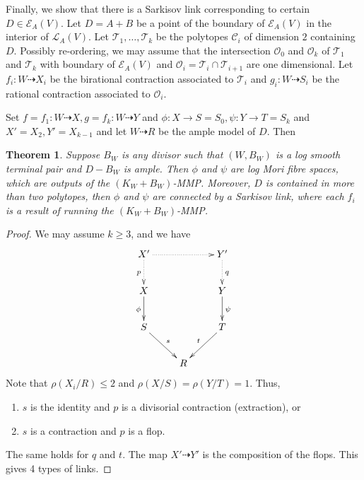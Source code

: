 \documentclass[11pt]{amsart}
\newtheorem{thm}[defn]{Theorem}
\begin{document}
Finally, we show that there is a Sarkisov link corresponding to certain $D \in \mathcal{E}_{A}(V)$. Let $ D=A+B $ be a point of the boundary of $ \mathcal{E}_A(V) $ in the interior of $ \mathcal{L}_A(V) $. Let $ \mathcal{T}_1, \ldots, \mathcal{T}_k $ be the polytopes $ \mathcal{C}_i $ of dimension $ 2 $ containing $ D $. Possibly re-ordering, we may assume that  the intersection  $ \mathcal{O}_0 $ and $ \mathcal{O}_k $ of $ \mathcal{T}_1 $ and $ \mathcal{T}_k $ with boundary of $ \mathcal{E}_A(V) $ and  $ \mathcal{O}_i=\mathcal{T}_i\cap\mathcal{T}_{i+1} $ are one dimensional. Let $ f_i:W\dashrightarrow  X_i $ be the birational contraction associated to $ \mathcal{T}_i $ and $ g_i:W\dashrightarrow  S_i $ be the rational contraction associated to $ \mathcal{O}_i $.
\begin{center}
\end{center}

Set $ f=f_1:W\dashrightarrow X, g=f_k:W\dashrightarrow Y $ and $ \phi:X\to S=S_0,\psi:Y\to T=S_k $ and $ X'=X_2,Y'=X_{k-1} $ and let $ W\dashrightarrow R $ be the ample model of $ D $. Then
\begin{thm}\label{constructlink}
  \cite[Theorem 3.7]{haconSarkisovProgram2012} Suppose $ B_W $ is any divisor such that $ (W,B_W) $ is a log smooth terminal pair and $ D-B_W $ is ample. Then $ \phi $ and $ \psi $ are log Mori fibre spaces, which are outputs of the $ (K_W+B_W) $-MMP. Moreover, $ D $ is contained in more than two polytopes, then $\phi$ and $\psi$ are connected by a Sarkisov link, where each $f_{i}$ is a result of running the $(K_{W}+B_{W})$-MMP.
\end{thm}
\begin{proof}
  We may assume $ k\geqslant 3 $, and we have
  $$ \xymatrix{
      X'\ar@{.>}[d]_p\ar@{.>}[rr]&&Y'\ar@{.>}[d]^q\\
      X\ar[d]_{\phi}&&Y\ar[d]^\psi\\
      S\ar[rd]^s&&T\ar[ld]_t\\
      &R&} $$
  Note that $ \rho(X_i/R)\leqslant 2 $ and $ \rho(X/S)=\rho(Y/T)=1 $. Thus,
  \begin{enumerate}
    \item $ s $ is the identity and $ p $ is a divisorial contraction (extraction), or
    \item $ s $ is a contraction and $ p $ is a flop.
  \end{enumerate}
  The same holds for $ q $ and $ t $. The map $X'\dashrightarrow Y'$ is the composition of the flops. This gives 4 types of links.
\end{proof}
\end{document}
